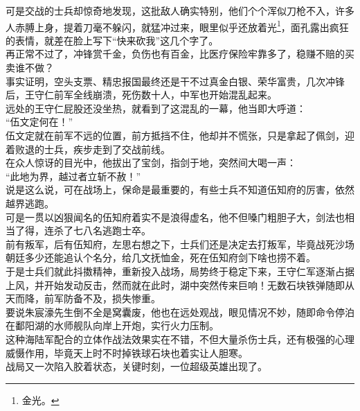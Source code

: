 \begin{multicols}{\theparacolNo}
可是交战的士兵却惊奇地发现，这批敌人确实特别，他们个个浑似刀枪不入，许多人赤膊上身，提着刀毫不躲闪，就猛冲过来，眼里似乎还放着光\footnote{金光。}，面孔露出疯狂的表情，就差在脸上写下“快来砍我”这几个字了。\\

再正常不过了，冲锋赏千金，负伤也有百金，比医疗保险牢靠多了，稳赚不赔的买卖谁不做？\\

事实证明，空头支票、精忠报国最终还是干不过真金白银、荣华富贵，几次冲锋后，王守仁前军全线崩溃，死伤数十人，中军也开始混乱起来。\\

远处的王守仁屁股还没坐热，就看到了这混乱的一幕，他当即大呼道：\\

“伍文定何在！”\\

伍文定就在前军不远的位置，前方抵挡不住，他却并不慌张，只是拿起了佩剑，迎着败退的士兵，疾步走到了交战前线。\\

在众人惊讶的目光中，他拔出了宝剑，指剑于地，突然间大喝一声：\\

“此地为界，越过者立斩不赦！”\\

说是这么说，可在战场上，保命是最重要的，有些士兵不知道伍知府的厉害，依然越界逃跑。\\

可是一贯以凶狠闻名的伍知府着实不是浪得虚名，他不但嗓门粗胆子大，剑法也相当了得，连杀了七八名逃跑士卒。\\

前有叛军，后有伍知府，左思右想之下，士兵们还是决定去打叛军，毕竟战死沙场朝廷多少还能追认个名分，给几文抚恤金，死在伍知府剑下啥也捞不着。\\

于是士兵们就此抖擞精神，重新投入战场，局势终于稳定下来，王守仁军逐渐占据上风，并开始发动反击，然而就在此时，湖中突然传来巨响！无数石块铁弹随即从天而降，前军防备不及，损失惨重。\\

要说朱宸濠先生倒不全是窝囊废，他也在远处观战，眼见情况不妙，随即命令停泊在鄱阳湖的水师舰队向岸上开炮，实行火力压制。\\

这种海陆军配合的立体作战法效果实在不错，不但大量杀伤士兵，还有极强的心理威慑作用，毕竟天上时不时掉铁球石块也着实让人胆寒。\\

战局又一次陷入胶着状态，关键时刻，一位超级英雄出现了。\\


\end{multicols}
